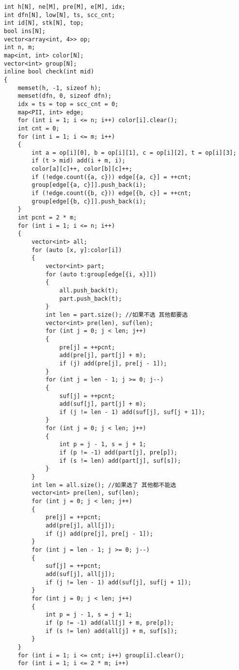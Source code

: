 \documentclass[a4paper, fontset=none]{ctexart}
\begin{document}
\begin{verbatim}
int h[N], ne[M], pre[M], e[M], idx;
int dfn[N], low[N], ts, scc_cnt;
int id[N], stk[N], top;
bool ins[N];
vector<array<int, 4>> op;
int n, m;
map<int, int> color[N];
vector<int> group[N];
inline bool check(int mid)
{
    memset(h, -1, sizeof h);
    memset(dfn, 0, sizeof dfn);
    idx = ts = top = scc_cnt = 0;
    map<PII, int> edge;
    for (int i = 1; i <= n; i++) color[i].clear();
    int cnt = 0;
    for (int i = 1; i <= m; i++)
    {
        int a = op[i][0], b = op[i][1], c = op[i][2], t = op[i][3];
        if (t > mid) add(i + m, i);
        color[a][c]++, color[b][c]++;
        if (!edge.count({a, c})) edge[{a, c}] = ++cnt;
        group[edge[{a, c}]].push_back(i);
        if (!edge.count({b, c})) edge[{b, c}] = ++cnt;
        group[edge[{b, c}]].push_back(i);
    }
    int pcnt = 2 * m;
    for (int i = 1; i <= n; i++)
    {
        vector<int> all;
        for (auto [x, y]:color[i])
        {
            vector<int> part;
            for (auto t:group[edge[{i, x}]])
            {
                all.push_back(t);
                part.push_back(t);
            }
            int len = part.size(); //如果不选 其他都要选
            vector<int> pre(len), suf(len);
            for (int j = 0; j < len; j++)
            {
                pre[j] = ++pcnt;
                add(pre[j], part[j] + m);
                if (j) add(pre[j], pre[j - 1]);
            }
            for (int j = len - 1; j >= 0; j--)
            {
                suf[j] = ++pcnt;
                add(suf[j], part[j] + m);
                if (j != len - 1) add(suf[j], suf[j + 1]);
            }
            for (int j = 0; j < len; j++)
            {
                int p = j - 1, s = j + 1;
                if (p != -1) add(part[j], pre[p]);
                if (s != len) add(part[j], suf[s]);
            }
        }
        int len = all.size(); //如果选了 其他都不能选
        vector<int> pre(len), suf(len);
        for (int j = 0; j < len; j++)
        {
            pre[j] = ++pcnt;
            add(pre[j], all[j]);
            if (j) add(pre[j], pre[j - 1]);
        }
        for (int j = len - 1; j >= 0; j--)
        {
            suf[j] = ++pcnt;
            add(suf[j], all[j]);
            if (j != len - 1) add(suf[j], suf[j + 1]);
        }
        for (int j = 0; j < len; j++)
        {
            int p = j - 1, s = j + 1;
            if (p != -1) add(all[j] + m, pre[p]);
            if (s != len) add(all[j] + m, suf[s]);
        }
    }
    for (int i = 1; i <= cnt; i++) group[i].clear();
    for (int i = 1; i <= 2 * m; i++)

\end{verbatim}
\end{document}
